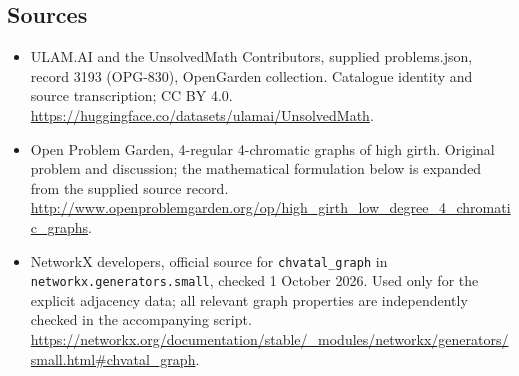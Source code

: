 \documentclass[11pt,a4paper]{article}
\begin{document}
\subsection{Sources}
\begin{itemize}
\item[S1] ULAM.AI and the UnsolvedMath Contributors, supplied problems.json, record 3193 (OPG-830), OpenGarden collection. Catalogue identity and source transcription; CC BY 4.0.
\url{https://huggingface.co/datasets/ulamai/UnsolvedMath}.
\item[S2] Open Problem Garden, 4-regular 4-chromatic graphs of high girth. Original problem and discussion; the mathematical formulation below is expanded from the supplied source record.
\url{http://www.openproblemgarden.org/op/high_girth_low_degree_4_chromatic_graphs}.
\item[S3] NetworkX developers, official source for \texttt{chvatal\_graph} in \texttt{networkx.generators.small}, checked 1 October 2026. Used only for the explicit adjacency data; all relevant graph properties are independently checked in the accompanying script.
\url{https://networkx.org/documentation/stable/_modules/networkx/generators/small.html#chvatal_graph}.
\end{itemize}
\end{document}
